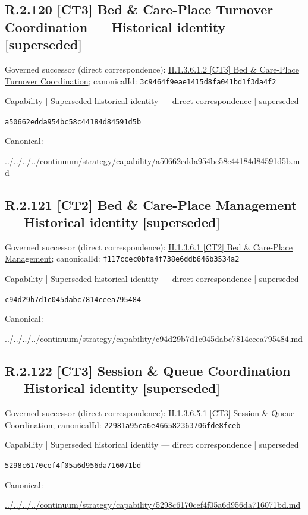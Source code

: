 \documentclass[10pt,a4paper]{article}
\begin{document}
\subsection*{R.2.120 [CT3] Bed \& Care-Place Turnover Coordination — Historical identity [superseded]}
Governed successor (direct correspondence): \hyperref[element-3c9464f9eae1415d8fa041bd1f3da4f2]{II.1.3.6.1.2 [CT3] Bed \& Care-Place Turnover Coordination}; canonicalId: \texttt{3c9464f9eae1415d8fa041bd1f3da4f2}\par
\label{element-a50662edda954bc58c44184d84591d5b}
{\small Capability | Superseded historical identity — direct correspondence | superseded}\par
\texttt{a50662edda954bc58c44184d84591d5b}\par
Canonical: \par
{\footnotesize\url{../../../../continuum/strategy/capability/a50662edda954bc58c44184d84591d5b.md}}\par
\subsection*{R.2.121 [CT2] Bed \& Care-Place Management — Historical identity [superseded]}
Governed successor (direct correspondence): \hyperref[element-f117ccec0bfa4f738e6ddb646b3534a2]{II.1.3.6.1 [CT2] Bed \& Care-Place Management}; canonicalId: \texttt{f117ccec0bfa4f738e6ddb646b3534a2}\par
\label{element-c94d29b7d1c045dabc7814ceea795484}
{\small Capability | Superseded historical identity — direct correspondence | superseded}\par
\texttt{c94d29b7d1c045dabc7814ceea795484}\par
Canonical: \par
{\footnotesize\url{../../../../continuum/strategy/capability/c94d29b7d1c045dabc7814ceea795484.md}}\par
\subsection*{R.2.122 [CT3] Session \& Queue Coordination — Historical identity [superseded]}
Governed successor (direct correspondence): \hyperref[element-22981a95ca6e466582363706fde8fceb]{II.1.3.6.5.1 [CT3] Session \& Queue Coordination}; canonicalId: \texttt{22981a95ca6e466582363706fde8fceb}\par
\label{element-5298c6170cef4f05a6d956da716071bd}
{\small Capability | Superseded historical identity — direct correspondence | superseded}\par
\texttt{5298c6170cef4f05a6d956da716071bd}\par
Canonical: \par
{\footnotesize\url{../../../../continuum/strategy/capability/5298c6170cef4f05a6d956da716071bd.md}}\par
\end{document}
